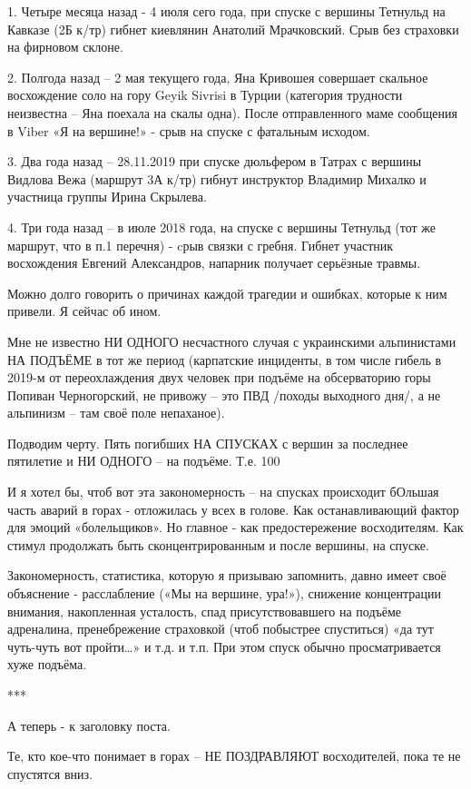1. Четыре месяца назад - 4 июля сего года, при спуске с вершины Тетнульд на
Кавказе (2Б к/тр) гибнет киевлянин Анатолий Мрачковский. Срыв без страховки на
фирновом склоне.

2. Полгода назад – 2 мая текущего года, Яна Кривошея совершает скальное
восхождение соло на гору Geyik Sivrisi в Турции (категория трудности неизвестна
– Яна поехала на скалы одна). После отправленного маме сообщения в Viber «Я на
вершине!» - срыв на спуске с фатальным исходом.

3. Два года назад – 28.11.2019 при спуске дюльфером в Татрах с вершины Видлова
Вежа (маршрут 3А к/тр) гибнут инструктор Владимир Михалко и участница группы
Ирина Скрылева.

4. Три года назад – в июле 2018 года, на спуске с вершины Тетнульд (тот же
маршрут, что в п.1 перечня) - cрыв связки с гребня. Гибнет участник восхождения
Евгений Александров, напарник получает серьёзные травмы.

Можно долго говорить о причинах каждой трагедии и ошибках, которые к ним
привели. Я сейчас об ином.

Мне не известно НИ ОДНОГО несчастного случая с украинскими альпинистами НА
ПОДЪЁМЕ в тот же период (карпатские инциденты, в том числе гибель в 2019-м от
переохлаждения двух человек при подъёме на обсерваторию горы Попиван
Черногорский, не привожу – это ПВД /походы выходного дня/, а не альпинизм – там
своё поле непаханое).

Подводим черту. Пять погибших НА СПУСКАХ с вершин за последнее пятилетие и НИ
ОДНОГО – на подъёме. Т.е. 100%

И я хотел бы, чтоб вот эта закономерность – на спусках происходит бОльшая часть
аварий в горах - отложилась у всех в голове. Как останавливающий фактор для
эмоций «болельщиков». Но главное - как предостережение восходителям. Как стимул
продолжать быть сконцентрированным и после вершины, на спуске.

Закономерность, статистика, которую я призываю запомнить, давно имеет своё
объяснение - расслабление («Мы на вершине, ура!»), снижение концентрации
внимания, накопленная усталость, спад присутствовавшего на подъёме адреналина,
пренебрежение страховкой (чтоб побыстрее спуститься) «да тут чуть-чуть вот
пройти…»  и т.д. и т.п. При этом спуск обычно просматривается хуже подъёма.

***

А теперь - к заголовку поста.

Те, кто кое-что понимает в горах – НЕ ПОЗДРАВЛЯЮТ восходителей, пока те не
спустятся вниз.

